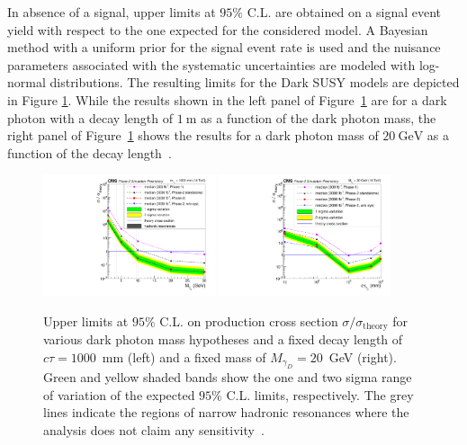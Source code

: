 In absence of a signal, upper limits at $95\%$ C.L. are obtained on a signal
event yield with respect to the one expected for the considered model. A Bayesian method with a uniform prior for the signal event rate is used and the nuisance
parameters associated with the systematic uncertainties are modeled with log-normal distributions.
The resulting limits for the Dark SUSY models are depicted in Figure \ref{fig:NewCompLimit_DarkPhoton}. While the results shown in the left panel of Figure~\ref{fig:NewCompLimit_DarkPhoton} are for a dark photon with a decay length of $1~\mathrm{m}$ as a function of the dark photon mass, the right panel of Figure~\ref{fig:NewCompLimit_DarkPhoton} shows the results for a dark photon mass of $20~\mathrm{GeV}$ as a function of the decay length~\cite{CMS-PAS-FTR-18-002}.



\begin{figure}[hbtp]
\begin{center}
\includegraphics[width=0.45\textwidth]{tex/figures/cmsupgrade/FTR-18-002/LimitComp_Ratio_DarkPhotons.pdf}
\includegraphics[width=0.45\textwidth]{tex/figures/cmsupgrade/FTR-18-002/LimitComp_Ratio_asfuncofCtau_DarkPhotons.pdf}
 \caption{Upper limits at $95\%$ C.L. on production cross section $\sigma / \sigma_{\text{theory}}$ for various dark photon mass hypotheses and a fixed decay length of $c\tau = 1000$~mm (left) and a fixed mass of $M_{\gamma_D} = 20$~GeV (right). Green and yellow shaded bands show the one and two sigma range of variation of the expected $95\%$ C.L. limits, respectively. The grey lines indicate the regions of narrow hadronic resonances where the analysis does not claim any sensitivity~\cite{CMS-PAS-FTR-18-002}.}
\label{fig:NewCompLimit_DarkPhoton}
\end{center}
\end{figure}


